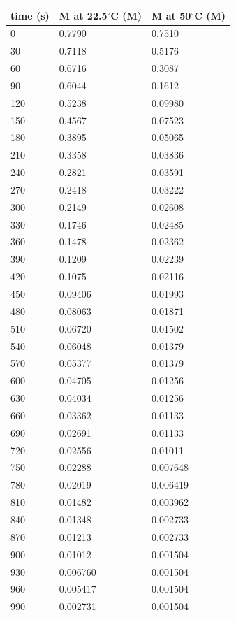 \documentclass[12pt]{article}
\begin{document}
	\begin{flushleft}
	\begin{tabular}{ l|l|l }
		time (s) & M at 22.5$^\circ$C (M) & M at 50$^\circ$C (M) \\
		\hline
		0 & 0.7790 & 0.7510 \\
		30 & 0.7118 & 0.5176 \\
		60 & 0.6716 & 0.3087 \\
		90 & 0.6044 & 0.1612 \\
		120 & 0.5238 & 0.09980 \\
		150 & 0.4567 & 0.07523 \\
		180 & 0.3895 & 0.05065 \\
		210 & 0.3358 & 0.03836 \\
		240 & 0.2821 & 0.03591 \\
		270 & 0.2418 & 0.03222 \\
		300 & 0.2149 & 0.02608 \\
		330 & 0.1746 & 0.02485 \\
		360 & 0.1478 & 0.02362 \\
		390 & 0.1209 & 0.02239 \\
		420 & 0.1075 & 0.02116 \\
		450 & 0.09406 & 0.01993 \\
		480 & 0.08063 & 0.01871 \\
		510 & 0.06720 & 0.01502 \\
		540 & 0.06048 & 0.01379 \\
		570 & 0.05377 & 0.01379 \\
		600 & 0.04705 & 0.01256 \\
		630 & 0.04034 & 0.01256 \\
		660 & 0.03362 & 0.01133 \\
		690 & 0.02691 & 0.01133 \\
		720 & 0.02556 & 0.01011 \\
		750 & 0.02288 & 0.007648 \\
		780 & 0.02019 & 0.006419 \\
		810 & 0.01482 & 0.003962 \\
		840 & 0.01348 & 0.002733 \\
		870 & 0.01213 & 0.002733 \\
		900 & 0.01012 & 0.001504 \\
		930 & 0.006760 & 0.001504 \\
		960 & 0.005417 & 0.001504 \\
		990 & 0.002731 & 0.001504
	\end{tabular}
	\end{flushleft}
\end{document}
